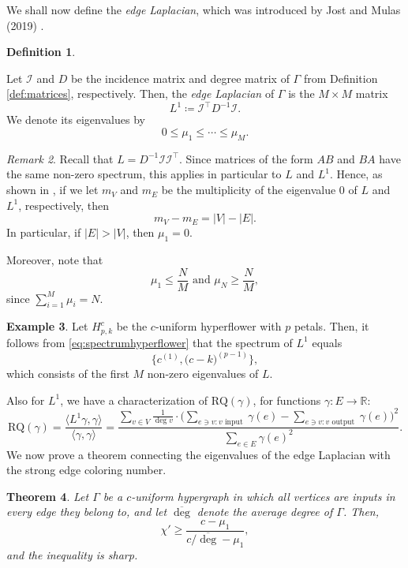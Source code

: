 \documentclass{article}
\newcommand{\R}{\mathbb{R}}
\newcommand{\RQ}{\textrm{RQ}}
\theoremstyle{plain}
\newtheorem{theorem}{Theorem}[section]
\theoremstyle{definition}
\newtheorem{definition}[theorem]{Definition}
\newtheorem{example}[theorem]{Example}
\theoremstyle{remark}
\newtheorem{remark}[theorem]{Remark}
\begin{document}
We shall now define the \emph{edge Laplacian}, which was introduced by Jost and Mulas (2019) \cite{JostMulas2019}.
\begin{definition}\label{def:edgeLaplacian}

    Let $\mathcal I$ and $D$ be the incidence matrix and degree matrix of $\Gamma$ from Definition \ref{def:matrices}, respectively. Then, the \emph{edge Laplacian} of $\Gamma$ is the $M\times M$ matrix
    \[
    L^1 \coloneqq \mathcal I^\top  D^{-1}\mathcal I.
    \]
    We denote its eigenvalues by
    \[
    0 \leq \mu_1\leq \cdots\leq \mu_M.
    \]
\end{definition}
\begin{remark}\label{rmk:multiplicity0}
    Recall that $L=D^{-1}\mathcal I\mathcal I^\top$. Since matrices of the form $AB$ and $BA$ have the same non-zero spectrum, this applies in particular to $L$ and $L^1$. Hence, as  shown in \cite[Corollary 14]{JostMulas2019}, if we let $m_V$ and $m_E$ be the multiplicity of the eigenvalue $0$ of $L$ and $L^1$, respectively, then
    \begin{equation}\label{eq:multiplicity0}
        m_V-m_E = |V| - |E|.
    \end{equation}
    In particular, if $|E|>|V|$, then $\mu_1=0$.
    
    Moreover, note that $$\mu_1\leq \frac N M \text{ and }\mu_N\geq \frac NM,$$
    since $\sum_{i=1}^M \mu_i = N$.
\end{remark}
\begin{example}
    Let $H_{p,k}^c$ be the $c$-uniform hyperflower with $p$ petals. Then, it follows from \eqref{eq:spectrumhyperflower} that the spectrum of $L^1$ equals
    \[
    \biggl\{ c^{(1)}, \bigl(c-k\bigr)^{(p-1)}\biggr\},
    \]
    which consists of the first $M$ non-zero eigenvalues of $L$.
\end{example}
Also for $L^1$, we have a characterization of $\RQ(\gamma)$, for functions $\gamma\colon E\to \R$:
\begin{equation}
    \RQ(\gamma) = \frac{\langle L^1 \gamma,\gamma\rangle}{\langle \gamma,\gamma\rangle} = \frac{\sum_{v\in V}\frac1{\deg v}\cdot \biggl(\sum_{e\ni v\colon v \text{ input }}\gamma(e)-\sum_{e\ni v\colon v \text{ output }}\gamma(e)\biggr)^2}{\sum_{e\in E}\gamma(e)^2}.
\end{equation}
We now prove a theorem connecting the eigenvalues of the edge Laplacian with the strong edge coloring number.


\begin{theorem}\label{thm:edgecoloring}
   Let $\Gamma$ be a $c$-uniform hypergraph in which all vertices are inputs in every edge they belong to, and let $\overline{\deg}$ denote the average degree of $\Gamma$. Then,
    \begin{equation}\label{eq:edgecoloring}
        \chi' \geq \frac{c-\mu_1}{c/\overline{\deg}-\mu_1},
    \end{equation}
    and the inequality is sharp.
\end{theorem}
\end{document}
